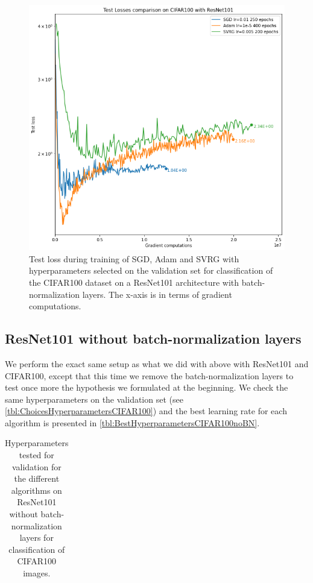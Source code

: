 \documentclass[a4paper,11pt,oneside]{report}
\begin{document}
\begin{figure}
    \centering
    \includegraphics[width=\columnwidth]{figures/ResNet101Results.png}
    \caption{Test loss during training of SGD, Adam and SVRG with hyperparameters selected on the validation set for classification of the CIFAR100 dataset on a ResNet101 architecture with batch-normalization layers. The x-axis is in terms of gradient computations.}
    \label{fig:ResNet101results}
\end{figure}





\subsection{ResNet101 without batch-normalization layers}\label{seq:ResNet101noBN}

We perform the exact same setup as what we did with above with ResNet101 and CIFAR100, except that this time we remove the batch-normalization layers to test once more the hypothesis we formulated at the beginning. We check the same hyperparameters on the validation set (see \autoref{tbl:ChoicesHyperparametersCIFAR100}) and the best learning rate for each algorithm is presented in \autoref{tbl:BestHyperparametersCIFAR100noBN}.

\begin{table}
    \begin{center}
        \begin{tabular}{||c | c | l||}
             \hline
             
        \end{tabular}
    \end{center}
    \caption{Hyperparameters tested for validation for the different algorithms on ResNet101 without batch-normalization layers for classification of CIFAR100 images.
    }
    \label{tbl:BestHyperparametersCIFAR100noBN}
\end{table}
\end{document}
